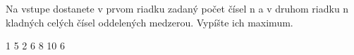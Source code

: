




Na vstupe dostanete v prvom riadku zadaný počet čísel n a v druhom riadku n kladných celých čísel oddelených medzerou. Vypíšte ich maximum.

1 5 2 6 8 10 6
\koniec


